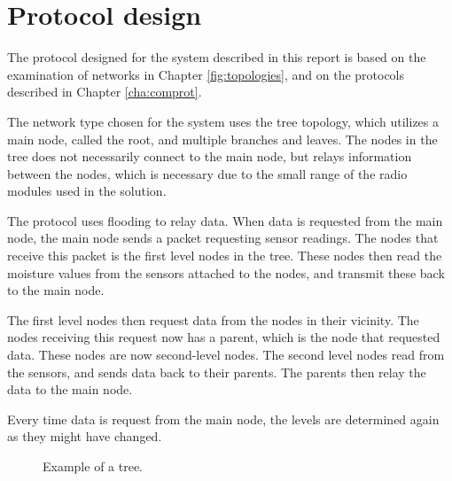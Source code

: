 \section{Protocol design}
The protocol designed for the system described in this report is based on the examination of networks in Chapter \ref{fig:topologies}, and on the protocols described in Chapter \ref{cha:comprot}.

The network type chosen for the system uses the tree topology, which utilizes a main node, called the root, and multiple branches and leaves. The nodes in the tree does not necessarily connect to the main node, but relays information between the nodes, which is necessary due to the small range of the radio modules used in the solution.

The protocol uses flooding to relay data. When data is requested from the main node, the main node sends a packet requesting sensor readings. The nodes that receive this packet is the first level nodes in the tree. These nodes then read the moisture values from the sensors attached to the nodes, and transmit these back to the main node. 

The first level nodes then request data from the nodes in their vicinity. The nodes receiving this request now has a parent, which is the node that requested data. These nodes are now second-level nodes. The second level nodes read from the sensors, and sends data back to their parents. The parents then relay the data to the main node.

Every time data is request from the main node, the levels are determined again as they might have changed.

\begin{figure}[!h]
	\centering
	\caption{Example of a tree.}
	\label{fig:prottree1}
\end{figure}

